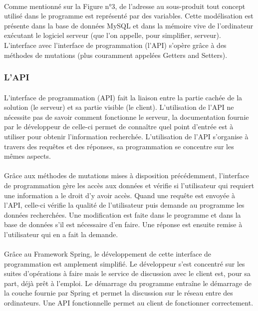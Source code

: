 \documentclass[a4paper, 12pt]{article}
\begin{document}
\paragraph{}Comme mentionné sur la Figure n°3, de l’adresse au sous-produit tout concept utilisé dans le programme est représenté par des variables.  Cette modélisation est présente dans la base de données MySQL et dans la mémoire vive de l’ordinateur exécutant le logiciel serveur (que l’on appelle, pour simplifier, serveur). L’interface avec l’interface de programmation (l’API) s’opère grâce à des méthodes de mutations (plus couramment appelées Getters and Setters).

\subsubsection{L'API}

\paragraph{}L’interface de programmation (API) fait la liaison entre la partie cachée de la solution (le serveur) et sa partie visible (le client). L’utilisation de l’API ne nécessite pas de savoir comment fonctionne le serveur, la documentation fournie par le développeur de celle-ci permet de connaître quel point d’entrée est à utiliser pour obtenir l’information recherchée. L’utilisation de l’API s’organise à travers des requêtes et des réponses, sa programmation se concentre sur les mêmes aspects.
\paragraph{}Grâce aux méthodes de mutations mises à disposition précédemment, l’interface de programmation gère les accès aux données et vérifie si l’utilisateur qui requiert une information a le droit d’y avoir accès. Quand une requête est envoyée à l’API, celle-ci vérifie la qualité de l’utilisateur puis demande au programme les données recherchées. Une modification est faite dans le programme et dans la base de données s’il est nécessaire d’en faire. Une réponse est ensuite remise à l’utilisateur qui en a fait la demande.
\paragraph{}Grâce au Framework Spring, le développement de cette interface de programmation est amplement simplifié. Le développeur s’est concentré sur les suites d’opérations à faire mais le service de discussion avec le client est, pour sa part, déjà prêt à l’emploi. Le démarrage du programme entraîne le démarrage de la couche fournie par Spring et permet la discussion sur le réseau entre des ordinateurs.
\noindent Une API fonctionnelle permet au client de fonctionner correctement.
\end{document}
